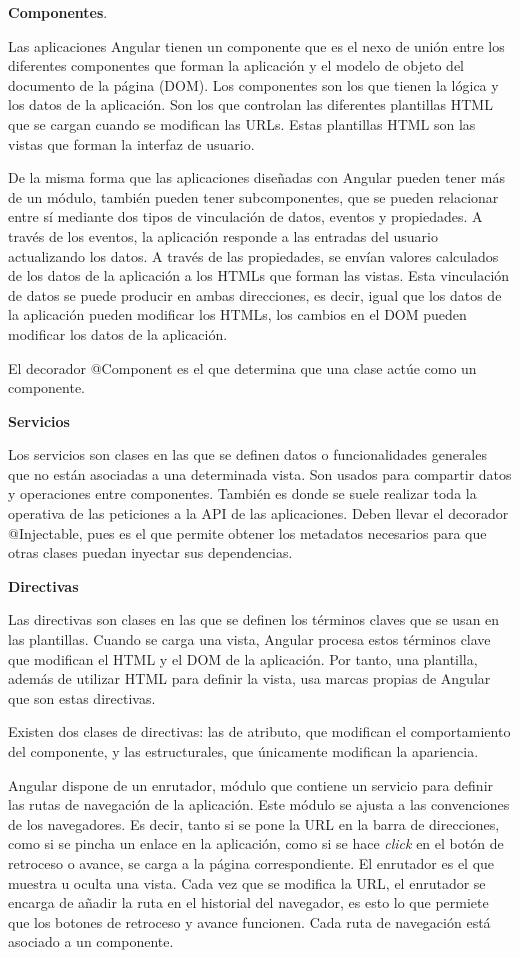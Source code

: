 \documentclass[a4paper, 12pt]{book}
\begin{document}
\textbf{Componentes}. 

Las aplicaciones Angular tienen un componente que es el nexo de unión entre los diferentes componentes que forman la aplicación y el modelo de objeto del documento de la página (DOM). Los componentes son los que tienen la lógica y los datos de la aplicación. Son los que controlan las diferentes plantillas HTML que se cargan cuando se modifican las URLs. Estas plantillas HTML son las vistas que forman la interfaz de usuario.

De la misma forma que las aplicaciones diseñadas con Angular pueden tener más de un módulo, también pueden tener subcomponentes, que se pueden relacionar entre sí mediante dos tipos de vinculación de datos, eventos y propiedades. A través de los eventos, la aplicación responde a las entradas del usuario actualizando los datos. A través de las propiedades, se envían valores calculados de los datos de la aplicación a los HTMLs que forman las vistas. Esta vinculación de datos se puede producir en ambas direcciones, es decir, igual que los datos de la aplicación pueden modificar los HTMLs, los cambios en el DOM pueden modificar los datos de la aplicación.

El decorador @Component es el que determina que una clase actúe como un componente. 

\textbf{Servicios}

Los servicios son clases en las que se definen datos o funcionalidades generales que no están asociadas a una determinada vista. Son usados para compartir datos y operaciones entre componentes. También es donde se suele realizar toda la operativa de las peticiones a la API de las aplicaciones. Deben llevar el decorador @Injectable, pues es el que permite obtener los metadatos necesarios para que otras clases puedan inyectar sus dependencias. 

\textbf{Directivas}

Las directivas son clases en las que se definen los términos claves que se usan en las plantillas. Cuando se carga una vista, Angular procesa estos términos clave que modifican el HTML y el DOM de la aplicación. Por tanto, una plantilla, además de utilizar HTML para definir la vista, usa marcas propias de Angular que son estas directivas. 

Existen dos clases de directivas: las de atributo, que modifican el comportamiento del componente, y las estructurales, que únicamente modifican la apariencia. 

Angular dispone de un enrutador, módulo que contiene un servicio para definir las rutas de navegación de la aplicación. Este módulo se ajusta a las convenciones de los navegadores. Es decir, tanto si se pone la URL en la barra de direcciones, como si se pincha un enlace en la aplicación, como si se hace \emph{click} en el botón de retroceso o avance, se carga a la página correspondiente. El enrutador es el que muestra u oculta una vista. Cada vez que se modifica la URL, el enrutador se encarga de añadir la ruta en el historial del navegador, es esto lo que permiete que los botones de retroceso y avance funcionen. Cada ruta de navegación está asociado a un componente. 
\end{document}
